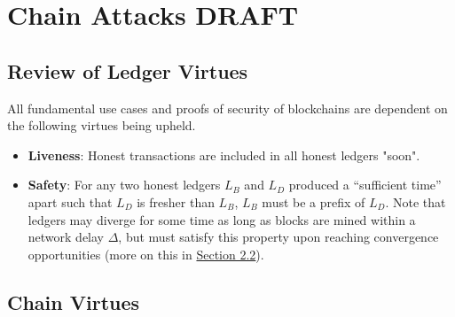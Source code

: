 \chapter{Chain Attacks \small{\textsf{DRAFT}}}

\section{Review of Ledger Virtues}
All fundamental use cases and proofs of security of blockchains are dependent on the following virtues being upheld.

\begin{itemize}
    \label{sec:liveness}
    \item \textbf{Liveness}: Honest transactions are included in all honest ledgers "soon".
    \label{sec:saftey}
    \item \textbf{Safety}: For any two honest ledgers $L_B$ and $L_D$ produced a ``sufficient time'' apart such that $L_D$ is fresher than $L_B$, $L_B$ must be a prefix of $L_D$. Note that ledgers may diverge for some time as long as blocks are mined within a network delay $\Delta$, but must satisfy this property upon reaching convergence opportunities (more on this in \hyperref[sec:mechanics]{Section 2.2}).
\end{itemize}

\section{Chain Virtues}
